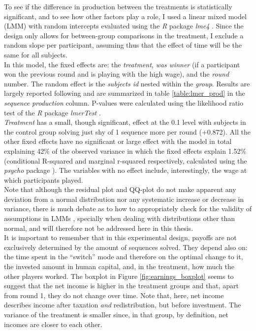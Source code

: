 To see if the difference in production between the treatments is statistically significant, and to see how other factors play a role, I used a linear mixed model (LMM) with random intercepts evaluated using the \textit{R} package \textit{lme4} \citep{bates2015}. Since the design only allows for between-group comparisons in the treatment, I exclude a random slope per participant, assuming thus that the effect of time will be the same for all subjects.\\

In this model, the fixed effects are: the \textit{treatment}, \textit{was winner} (if a participant won the previous round and is playing with the high wage), and the \textit{round} number. The random effect is the \textit{subjects id} nested within the \textit{group}. Results are largely reported following \cite{barr2013} and are summarized in table \ref{table:lmer_prod} in the \textit{sequence production} column. P-values were calculated using the likelihood ratio test of the \textit{R} package \textit{lmerTest} \citep{kuznetsova2017}.\\

\textit{Treatment} has a small, though significant, effect at the 0.1 level with subjects in the control group solving just shy of 1 sequence more per round (+0.872). All the other fixed effects have no significant or large effect with the model in total explaining 42\% of the observed variance in which the fixed effects explain 1.52\% (conditional R-squared and marginal r-squared respectively, calculated using the \textit{psycho} package \citep{makowski2018}). The variables with no effect include, interestingly, the wage at which participants played.\\

Note that although the residual plot and QQ-plot do not make apparent any deviation from a normal distribution nor any systematic increase or decrease in variance, there is much debate as to how to appropriately check for the validity of assumptions in LMMs  \citep{loy2017}, specially when dealing with distributions other than normal, and will therefore not be addressed here in this thesis.\\

It is important to remember that in this experimental design, payoffs are not exclusively determined by the amount of sequences solved. They depend also on: the time spent in the ``switch'' mode and therefore on the optimal change to it, the invested amount in human capital, and, in the treatment, how much the other players worked. The boxplot in Figure \ref{fig:earnings_boxplot} seems to suggest that the net income is higher in the treatment groups and that, apart from round 1, they do not change over time. Note that, here, net income describes income after taxation \textit{and} redistribution, but before investment. The variance of the treatment is smaller since, in that group, by definition, net incomes are closer to each other.\\

